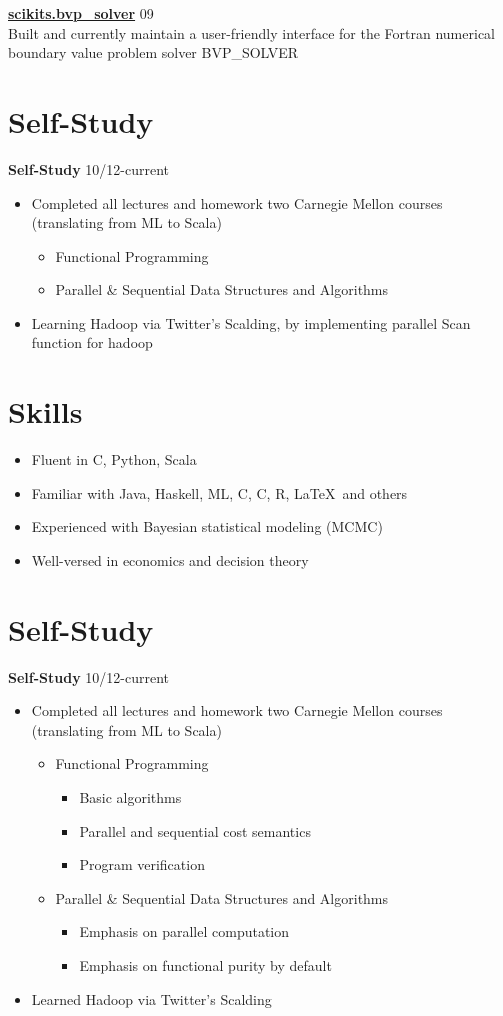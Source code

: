 \documentclass[margin]{res}
\newcommand{\bactivity}[3]{
  {\bf #1} #2 \hfill #3
    \vspace{6pt}
    \begin{itemize} \itemsep -2pt
      }
\newcommand{\eactivity}[0]{\end{itemize}}
\newcommand{\bitem}{\begin{itemize} \itemsep -2pt}
\newcommand{\eitem}{\end{itemize} }
\newcommand{\CPP}
{C\nolinebreak[4]\hspace{-.05em}\raisebox{.22ex}{\footnotesize\bf ++}}
\newcommand{\CS}
{C\nolinebreak[4]\hspace{-.05em}\raisebox{.22ex}{\footnotesize\bf \#}}
\begin{document}
\begin{resume}
    {\bf \href{packages.python.org/scikits.bvp\_solver}{scikits.bvp\_solver}} \hfill  09\\
      Built and currently maintain a user-friendly interface for the Fortran numerical \\
      boundary value problem solver BVP\_SOLVER 

\section{Self-Study}
 \bactivity{Self-Study}{}{10/12-current}
      \item Completed all lectures and homework two Carnegie Mellon courses (translating from ML to Scala)
      \bitem
        \item Functional Programming 
        \item Parallel \& Sequential Data Structures and Algorithms 
      \eitem
      \item Learning Hadoop via Twitter's Scalding, by implementing parallel Scan function for hadoop
    \eactivity

\section{Skills}
    \bitem
      \item Fluent in \CS, Python, Scala
      \item Familiar with Java, Haskell, ML, C, \CPP, R, \LaTeX\ and others
      \item Experienced with Bayesian statistical modeling (MCMC)
      \item Well-versed in economics and decision theory
    \eitem
    
\section{Self-Study}
 \bactivity{Self-Study}{}{10/12-current}
      \item Completed all lectures and homework two Carnegie Mellon courses (translating from ML to Scala)
      \bitem
        \item Functional Programming 
        \bitem
            \item Basic algorithms
            \item Parallel and sequential cost semantics
            \item Program verification
        \eitem
        \item Parallel \& Sequential Data Structures and Algorithms 
        \bitem 
          \item Emphasis on parallel computation
          \item Emphasis on functional purity by default
        \eitem
      \eitem
      \item Learned Hadoop via Twitter's Scalding
    \eactivity
 

\end{resume}
\end{document}
